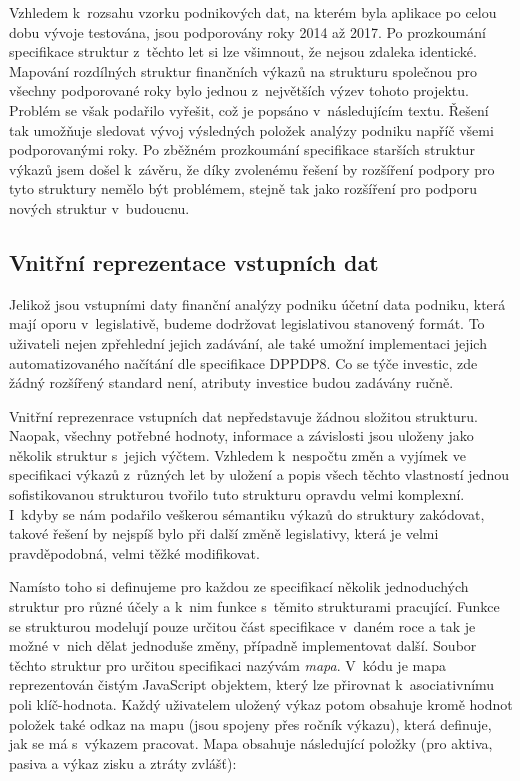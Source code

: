 Vzhledem k~rozsahu vzorku podnikových dat, na kterém byla aplikace po celou dobu vývoje testována, jsou podporovány roky 2014 až 2017. Po prozkoumání specifikace struktur z~těchto let si lze všimnout, že nejsou zdaleka identické. Mapování rozdílných struktur finančních výkazů na strukturu společnou pro všechny podporované roky bylo jednou z~největších výzev tohoto projektu. Problém se však podařilo vyřešit, což je popsáno v~následujícím textu. Řešení tak umožňuje sledovat vývoj výsledných položek analýzy podniku napříč všemi podporovanými roky. Po zběžném prozkoumání specifikace starších struktur výkazů jsem došel k~závěru, že díky zvolenému řešení by rozšíření podpory pro tyto struktury nemělo být problémem, stejně tak jako rozšíření pro podporu nových struktur v~budoucnu.

\subsection{Vnitřní reprezentace vstupních dat}
Jelikož jsou vstupními daty finanční analýzy podniku účetní data podniku, která mají oporu v~legislativě, budeme dodržovat legislativou stanovený formát. To uživateli nejen zpřehlední jejich zadávání, ale také umožní implementaci jejich automatizovaného načítání dle specifikace DPPDP8. Co se týče investic, zde žádný rozšířený standard není, atributy investice budou zadávány ručně.

Vnitřní reprezenrace vstupních dat nepředstavuje žádnou složitou strukturu. Naopak, všechny potřebné hodnoty, informace a závislosti jsou uloženy jako několik struktur s~jejich výčtem. Vzhledem k~nespočtu změn a vyjímek ve specifikaci výkazů z~různých let by uložení a popis všech těchto vlastností jednou sofistikovanou strukturou tvořilo tuto strukturu opravdu velmi komplexní. I~kdyby se nám podařilo veškerou sémantiku výkazů do struktury zakódovat, takové řešení by nejspíš bylo při další změně legislativy, která je velmi pravděpodobná, velmi těžké modifikovat.

Namísto toho si definujeme pro každou ze specifikací několik jednoduchých struktur pro různé účely a k~nim funkce s~těmito strukturami pracující. Funkce se strukturou modelují pouze určitou část specifikace v~daném roce a tak je možné v~nich dělat jednoduše změny, případně implementovat další. Soubor těchto struktur pro určitou specifikaci nazývám \textit{mapa}. V~kódu je mapa reprezentován čistým JavaScript objektem, který lze přirovnat k~asociativnímu poli klíč-hodnota. Každý uživatelem uložený výkaz potom obsahuje kromě hodnot položek také odkaz na mapu (jsou spojeny přes ročník výkazu), která definuje, jak se má s~výkazem pracovat. Mapa obsahuje následující položky (pro aktiva, pasiva a výkaz zisku a ztráty zvlášť):


